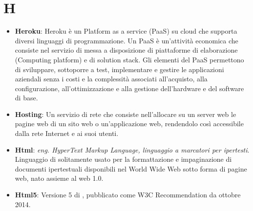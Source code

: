 \section*{H}
\begin{itemize}
	\item
	\textbf{Heroku}: Heroku è un Platform as a service (PaaS) su cloud che supporta diversi linguaggi di programmazione. Un PaaS è un'attività economica che consiste nel servizio di messa a disposizione di piattaforme di elaborazione (Computing platform) e di solution stack. Gli elementi del PaaS permettono di sviluppare, sottoporre a test, implementare e gestire le applicazioni aziendali senza i costi e la complessità associati all'acquisto, alla configurazione, all'ottimizzazione e alla gestione dell'hardware e del software di base.
	\item
	\textbf{Hosting}: Un servizio di rete che consiste nell'allocare su un server web le pagine web di un sito web o un'applicazione web, rendendolo così accessibile dalla rete Internet e ai suoi utenti.
	\item
	\textbf{Html}: \textit{eng. HyperText Markup Language, linguaggio a marcatori per ipertesti}. Linguaggio di  solitamente usato per la formattazione e impaginazione di documenti ipertestuali disponibili nel World Wide Web sotto forma di pagine web, nato assieme al web 1.0.
	\item
	\textbf{Html5}: Versione 5 di , pubblicato come W3C Recommendation da ottobre 2014.
\end{itemize}
\newpage